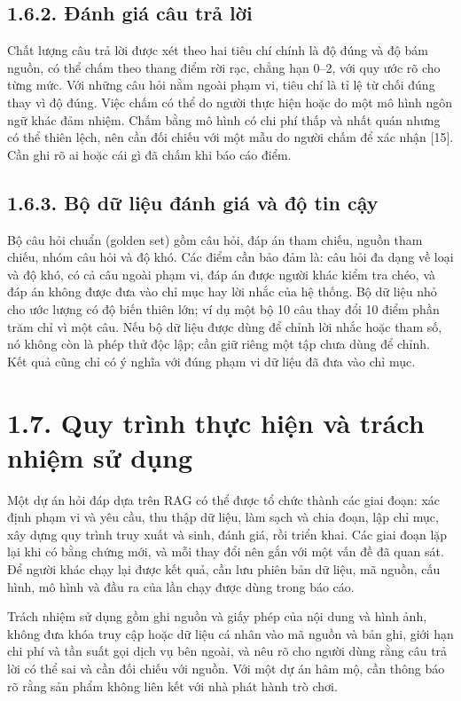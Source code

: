 \subsection{1.6.2. Đánh giá câu trả lời}

Chất lượng câu trả lời được xét theo hai tiêu chí chính là độ đúng và độ bám nguồn, có thể chấm theo thang điểm rời rạc, chẳng hạn 0--2, với quy ước rõ cho từng mức. Với những câu hỏi nằm ngoài phạm vi, tiêu chí là tỉ lệ từ chối đúng thay vì độ đúng. Việc chấm có thể do người thực hiện hoặc do một mô hình ngôn ngữ khác đảm nhiệm. Chấm bằng mô hình có chi phí thấp và nhất quán nhưng có thể thiên lệch, nên cần đối chiếu với một mẫu do người chấm để xác nhận [15]. Cần ghi rõ ai hoặc cái gì đã chấm khi báo cáo điểm.


\subsection{1.6.3. Bộ dữ liệu đánh giá và độ tin cậy}

Bộ câu hỏi chuẩn (golden set) gồm câu hỏi, đáp án tham chiếu, nguồn tham chiếu, nhóm câu hỏi và độ khó. Các điểm cần bảo đảm là: câu hỏi đa dạng về loại và độ khó, có cả câu ngoài phạm vi, đáp án được người khác kiểm tra chéo, và đáp án không được đưa vào chỉ mục hay lời nhắc của hệ thống. Bộ dữ liệu nhỏ cho ước lượng có độ biến thiên lớn; ví dụ một bộ 10 câu thay đổi 10 điểm phần trăm chỉ vì một câu. Nếu bộ dữ liệu được dùng để chỉnh lời nhắc hoặc tham số, nó không còn là phép thử độc lập; cần giữ riêng một tập chưa dùng để chỉnh. Kết quả cũng chỉ có ý nghĩa với đúng phạm vi dữ liệu đã đưa vào chỉ mục.


\section{1.7. Quy trình thực hiện và trách nhiệm sử dụng}

Một dự án hỏi đáp dựa trên RAG có thể được tổ chức thành các giai đoạn: xác định phạm vi và yêu cầu, thu thập dữ liệu, làm sạch và chia đoạn, lập chỉ mục, xây dựng quy trình truy xuất và sinh, đánh giá, rồi triển khai. Các giai đoạn lặp lại khi có bằng chứng mới, và mỗi thay đổi nên gắn với một vấn đề đã quan sát. Để người khác chạy lại được kết quả, cần lưu phiên bản dữ liệu, mã nguồn, cấu hình, mô hình và đầu ra của lần chạy được dùng trong báo cáo.


Trách nhiệm sử dụng gồm ghi nguồn và giấy phép của nội dung và hình ảnh, không đưa khóa truy cập hoặc dữ liệu cá nhân vào mã nguồn và bản ghi, giới hạn chi phí và tần suất gọi dịch vụ bên ngoài, và nêu rõ cho người dùng rằng câu trả lời có thể sai và cần đối chiếu với nguồn. Với một dự án hâm mộ, cần thông báo rõ rằng sản phẩm không liên kết với nhà phát hành trò chơi.
